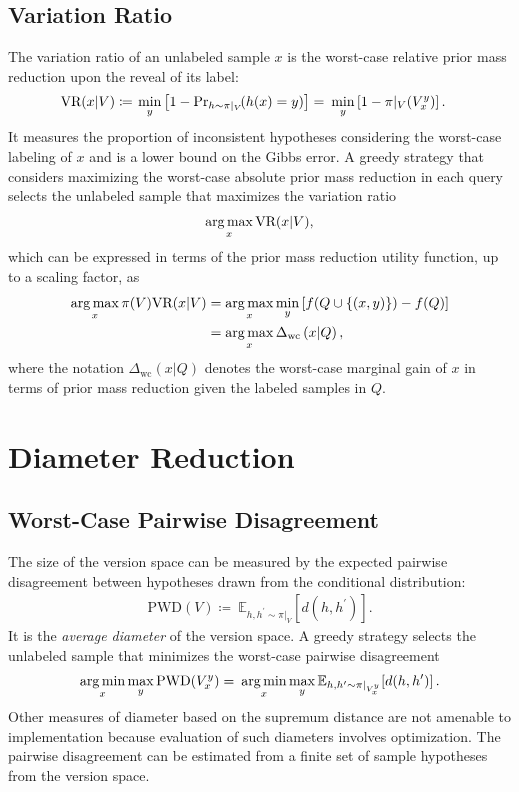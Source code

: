 \documentclass[runningheads, envcountsame, a4paper]{llncs}
\newcommand{\argmax}{\operatornamewithlimits{arg\,max}}
\newcommand{\argmin}{\operatornamewithlimits{arg\,min}}
\begin{document}
\subsection{Variation Ratio}
\label{sec:variation_ratio}
The variation ratio of an unlabeled sample $x$ is the worst-case relative prior mass reduction upon the reveal of its label:
\begin{align}
    \text{VR}(x | V) \coloneqq& \: \min_y\left[ 1 - \textmd{Pr}_{h \sim \pi|_V}\! (h(x)=y) \right] 
    =\: \min_y\left[ 1 - \pi|_V(V_x^y) \right].
    \label{eq:var_ratio}
\end{align}
It measures the proportion of inconsistent hypotheses considering the worst-case labeling of $x$ and is a lower bound on the Gibbs error. A greedy strategy that considers maximizing the worst-case absolute prior mass reduction in each query selects the unlabeled sample that maximizes the variation ratio
\begin{align}
    \argmax_x \text{VR}(x | V),
    \label{eq:max_var_ratio}
\end{align}
which can be expressed in terms of the prior mass reduction utility function, up to a scaling factor, as
\begin{align}
\argmax_x \pi(V) \text{VR}(x | V) 
    &= \argmax_x \min_y\left[ f(Q \cup \{(x,y)\}) - f(Q) \right] \\
    &= \argmax_x \Delta_{\text{wc}}\left(x | Q\right),
\end{align}
where the notation $\Delta_{\text{wc}}\left(x | Q\right)$ denotes the worst-case marginal gain of $x$ in terms of prior mass reduction given the labeled samples in $Q$.




\section{Diameter Reduction}
\label{sec:diameter_reduction}


\subsection{Worst-Case Pairwise Disagreement}
\label{sec:worst_case_pairwise_disagreement}
The size of the version space can be measured by the expected pairwise disagreement between hypotheses drawn from the conditional distribution:
\begin{align}
    \text{PWD}(V) \coloneqq\: \mathbb{E}_{h,h^\prime \sim \pi|_V}\! \left[ d(h, h^\prime) \right].
\end{align}
It is the \textit{average diameter} of the version space.
A greedy strategy selects the unlabeled sample that minimizes the worst-case pairwise disagreement
\begin{align}
    \argmin_x \max_y \text{PWD}(V_x^y) =\: \argmin_x \max_y \mathbb{E}_{h,h^\prime \sim \pi|_{V_x^y}}\! \left[ d(h, h^\prime) \right].
\end{align}
Other measures of diameter based on the supremum distance \cite{Kaariainen05,Dasgupta06} are not amenable to implementation because evaluation of such diameters involves optimization. The pairwise disagreement can be estimated from a finite set of sample hypotheses from the version space.
\end{document}
